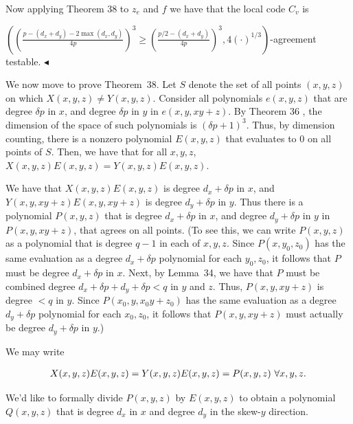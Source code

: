 \documentclass[10pt,a4paper]{article}
\begin{document}
Now applying Theorem 38 to $z_{e}$ and $f$ we have that the local code $C_{v}$ is


$\left(\left(\frac{p-(d_{x}+d_{y})-2\max(d_{x},d_{y})}{4p}\right)^{3}\geq\left(\frac{p/2-(d_{x}+d_{y})}{4p}\right)^{3},4(\cdot)^{1/3}\right)$-agreement testable.
$\blacktriangleleft$\par




We now move to prove Theorem 38.
Let $S$ denote the set of all points $(x,y,z)$ on which $X(x,y,z)\not=Y(x,y,z)$. Consider all polynomials $e(x,y,z)$ that are degree $\delta p$ in $x$, and degree $\delta p$ in $y$ in $e(x,y,xy+z)$. By Theorem 36 , the dimension of the space of such polynomials is $(\delta p+1)^{3}$. Thus, by dimension counting, there is a nonzero polynomial $E(x,y,z)$ that evaluates to $0$ on all points of $S$. Then, we have that for all $x,y,z$, $X(x,y,z)E(x,y,z)=Y(x,y,z)E(x,y,z)$.\par




We have that $X(x,y,z)E(x,y,z)$ is degree $d_{x}+\delta p$ in $x$, and $Y(x,y,xy+z)E(x,y,xy+z)$ is degree $d_{y}+\delta p$ in $y$. Thus there is a polynomial $P(x,y,z)$ that is degree $d_{x}+\delta p$ in $x$, and degree $d_{y}+\delta p$ in $y$ in $P(x,y,xy+z)$, that agrees on all points. (To see this, we can write $P(x,y,z)$ as a polynomial that is degree $q-1$ in each of $x,y,z$. Since $P(x,y_{0},z_{0})$ has the same evaluation as a degree $d_{x}+\delta p$ polynomial for each $y_{0},z_{0}$, it follows that $P$ must be degree $d_{x}+\delta p$ in $x$. Next, by Lemma 34, we have that $P$ must be combined degree $d_{x}+\delta p+d_{y}+\delta p<q$ in $y$ and $z$. Thus, $P(x,y,xy+z)$ is degree $<q$ in $y$. Since $P(x_{0},y,x_{0}y+z_{0})$ has the same evaluation as a degree $d_{y}+\delta p$ polynomial for each $x_{0},z_{0}$, it follows that $P(x,y,xy+z)$ must actually be degree $d_{y}+\delta p$ in $y$.)\par




We may write\par


\[\begin{gathered}
X(x,y,z)E(x,y,z)=Y(x,y,z)E(x,y,z)=P(x,y,z)\nobreak\ \forall x,y,z.
\end{gathered}\]


We’d like to formally divide $P(x,y,z)$ by $E(x,y,z)$ to obtain a polynomial $Q(x,y,z)$ that is degree $d_{x}$ in $x$ and degree $d_{y}$ in the skew-$y$ direction.\par
\end{document}
